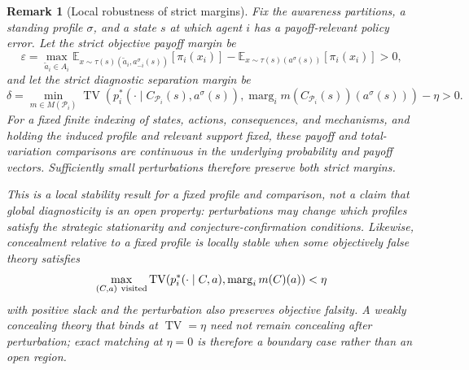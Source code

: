 \documentclass[11pt]{article}
\newtheorem{remark}[assumption]{Remark}
\theoremstyle{definition}
\newcommand{\TV}{\operatorname{TV}}
\newcommand{\marg}[1]{\operatorname{marg}_{#1}}
\begin{document}
\begin{remark}[Local robustness of strict margins]
Fix the awareness partitions, a standing profile \(\sigma\), and a state \(s\) at which agent \(i\) has a payoff-relevant policy error.
Let the strict objective payoff margin be
\[
\varepsilon
=
\max_{\widetilde a_i\in A_i}
\mathbb E_{x\sim
\tau(s)(\widetilde a_i,a_{-i}^{\sigma}(s))}
[\pi_i(x_i)]
-
\mathbb E_{x\sim\tau(s)(a^{\sigma}(s))}
[\pi_i(x_i)]
>0,
\]
and let the strict diagnostic separation margin be
\[
\delta
=
\min_{m\in M(\mathcal P_i)}
\TV\!\left(
p_i^{*}\!\left(
\cdot\mid
C_{\mathcal P_i}(s),a^{\sigma}(s)
\right),
\marg{i}m(C_{\mathcal P_i}(s))(a^{\sigma}(s))
\right)
-\eta
>0.
\]
For a fixed finite indexing of states, actions, consequences, and mechanisms, and holding the induced profile and relevant support fixed, these payoff and total-variation comparisons are continuous in the underlying probability and payoff vectors.
Sufficiently small perturbations therefore preserve both strict margins.

This is a local stability result for a fixed profile and comparison, not a claim that global diagnosticity is an open property: perturbations may change which profiles satisfy the strategic stationarity and conjecture-confirmation conditions.
Likewise, concealment relative to a fixed profile is locally stable when some objectively false theory satisfies
\[
\max_{(C,a)\ {\rm visited}}
\TV\!\left(
p_i^{*}(\cdot\mid C,a),
\marg{i}m(C)(a)
\right)
<\eta
\]
with positive slack and the perturbation also preserves objective falsity.
A weakly concealing theory that binds at
\(\TV=\eta\) need not remain concealing after perturbation; exact matching at \(\eta=0\) is therefore a boundary case rather than an open region.
\end{remark}
\end{document}
